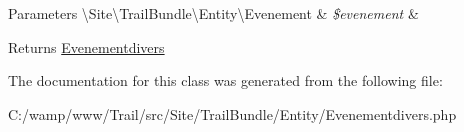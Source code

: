 \begin{DoxyParams}[1]{Parameters}
\textbackslash{}\+Site\textbackslash{}\+Trail\+Bundle\textbackslash{}\+Entity\textbackslash{}\+Evenement & {\em \$evenement} & \\
\hline
\end{DoxyParams}
\begin{DoxyReturn}{Returns}
\hyperlink{class_site_1_1_trail_bundle_1_1_entity_1_1_evenementdivers}{Evenementdivers} 
\end{DoxyReturn}


The documentation for this class was generated from the following file\+:\begin{DoxyCompactItemize}
\item 
C\+:/wamp/www/\+Trail/src/\+Site/\+Trail\+Bundle/\+Entity/Evenementdivers.\+php\end{DoxyCompactItemize}
